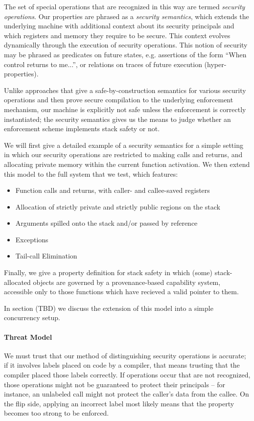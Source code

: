 \documentclass[10pt,conference]{ieeetran}%
\theoremstyle{definition}
\begin{document}
The set of special operations that are recognized in this way are termed
{\it security operations}. Our properties are phrased as a {\it security semantics},
which extends the underlying machine with additional context about its
security principals and which registers and memory they require to be secure.
This context evolves dynamically through the execution of security operations.
This notion of security may be phrased as
predicates on future states, e.g. assertions of the form
``When control returns to me...'', or relations on traces of future execution
(hyper-properties).

Unlike approaches that give a safe-by-construction semantics
for various security operations and then prove secure compilation to the underlying
enforcement mechanism, our machine is explicitly not safe unless the enforcement
is correctly instantiated; the security semantics gives us the means to judge whether
an enforcement scheme implements stack safety or not. 

We will first give a detailed example of a security semantics for a simple setting
in which our security operations are restricted to making calls and returns, and allocating
private memory within the current function activation. We then extend this model
to the full system that we test, which features:
\begin{itemize}
\item Function calls and returns, with caller- and callee-saved registers
\item Allocation of strictly private and strictly public regions on the stack
\item Arguments spilled onto the stack and/or passed by reference
\item Exceptions
\item Tail-call Elimination
\end{itemize}

Finally, we give a property definition for stack safety in which (some) stack-allocated
objects are governed by a provenance-based capability system, accessible only to those
functions which have recieved a valid pointer to them.

In section (TBD) we discuss the extension of this model into a simple concurrency setup.

\paragraph*{Threat Model}

We must trust that our method of distinguishing security operations is accurate; if it
involves labels placed on code by a compiler, that means trusting that the compiler placed
those labels correctly. If operations occur that are not recognized, those operations
might not be guaranteed to protect their principals -- for instance, an unlabeled call
might not protect the caller's data from the callee. On the flip side, applying an incorrect
label most likely means that the property becomes too strong to be enforced.
\end{document}
